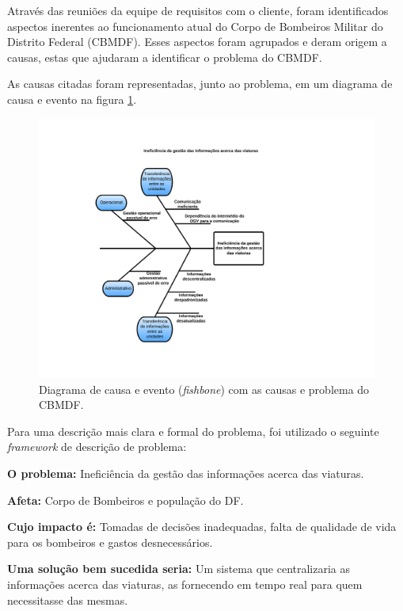 Através das reuniões da equipe de requisitos com o cliente, foram identificados aspectos inerentes ao funcionamento
atual do Corpo de Bombeiros Militar do Distrito Federal (CBMDF). Esses aspectos foram agrupados e deram origem a causas, estas
que ajudaram a identificar o problema do CBMDF.

As causas citadas foram representadas, junto ao problema, em um diagrama de causa e evento na figura \ref{fishbone}.

  \begin{figure}[!htbp]
    \centering
    \includegraphics[scale=0.8, angle=0]{figuras/fishbone}
    \caption{Diagrama de causa e evento (\textit{fishbone}) com as causas e problema do CBMDF.}
    \label{fishbone}
  \end{figure}

    \vfill
  \pagebreak

Para uma descrição mais clara e formal do problema, foi utilizado o seguinte \textit{framework} de descrição de problema:

  \textbf{O problema:} Ineficiência da gestão das informações acerca das viaturas.
  
  \textbf{Afeta:} Corpo de Bombeiros e população do DF.
  
  \textbf{Cujo impacto é:} Tomadas de decisões inadequadas, falta de qualidade de vida para os bombeiros e gastos desnecessários.
  
  \textbf{Uma solução bem sucedida seria:} Um sistema que centralizaria as informações acerca das viaturas, as fornecendo 
  em tempo real para quem necessitasse das mesmas.
  
  \vfill
  \pagebreak